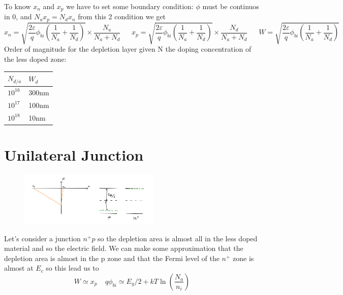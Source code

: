To know $x_n$ and $x_p$ we have to set some boundary condition: $\phi$ must be continuos in 0, and $N_ax_p=N_dx_n$ from this 2 condition we get 
\begin{equation}
x_n=\sqrt{\frac{2\varepsilon}{q}\phi_{bi}(\frac{1}{N_a}+\frac{1}{N_d})}\times \frac{N_a}{N_a+N_d}\ \ \ \ \ \ \ 
x_p=\sqrt{\frac{2\varepsilon}{q}\phi_{bi}(\frac{1}{N_a}+\frac{1}{N_d})}\times \frac{N_d}{N_a+N_d}\ \ \ \ \ \ \ 
W=\sqrt{\frac{2\varepsilon}{q}\phi_{bi}(\frac{1}{N_a}+\frac{1}{N_d})}
\end{equation}
\vspace{5mm}
Order of magnitude for the depletion layer given N the doping concentration of the less doped zone:

\begin{table}[]
\centering
\begin{tabular}{|l|l|}
\hline
$N_{d/a}$ & $W_d$ \\ \hline
$10^{16}$ & 300nm \\ \hline
$10^{17}$ & 100nm \\ \hline
$10^{18}$ & 10nm \\ \hline
\end{tabular}
\end{table}

\vspace{15mm}

\section{Unilateral Junction}

\begin{figure}
\includegraphics[width=0.6\textwidth]{pn6.png}
\end{figure}

Let's consider a junction $n^+p$ so the depletion area is almost all in the less doped material and so the electric field. We can make some approximation that the depletion area is almost in the p zone and that the Fermi level of the $n^+$ zone is almost at $E_c$ so this lead us to 
\begin{equation}
W\simeq x_p \ \ \ \ \ q\phi_{bi}\simeq E_g/2 + kT\ln(\frac{N_a}{n_i})
\end{equation}

